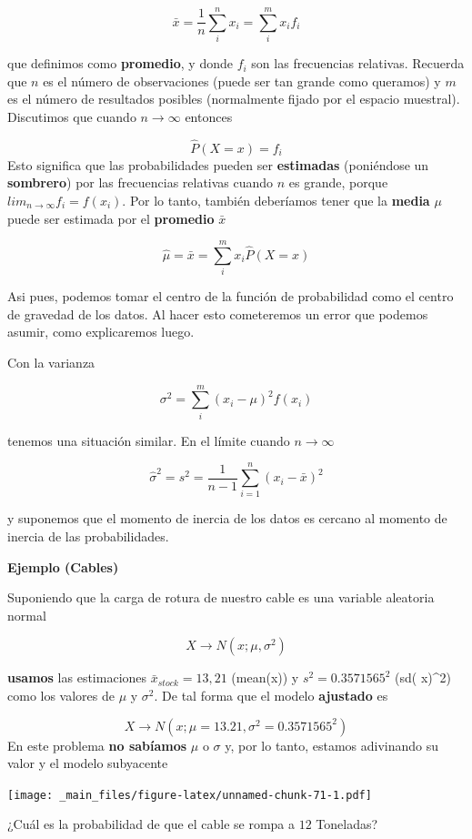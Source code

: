 \documentclass[
]{book}
\begin{document}
\[\bar{x}= \frac{1}{n} \sum_{i}^n x_i = \sum_{i}^m x_if_i\]

que definimos como \textbf{promedio}, y donde \(f_i\) son las frecuencias relativas. Recuerda que \(n\) es el número de observaciones (puede ser tan grande como queramos) y \(m\) es el número de resultados posibles (normalmente fijado por el espacio muestral). Discutimos que cuando \(n \rightarrow \infty\) entonces

\[\hat{P}(X=x)=f_i\]
Esto significa que las probabilidades pueden ser \textbf{estimadas} (poniéndose un \textbf{sombrero}) por las frecuencias relativas cuando \(n\) es grande, porque \(lim_{n\rightarrow \infty}f_i=f(x_i)\). Por lo tanto, también deberíamos tener que la \textbf{media} \(\mu\) puede ser estimada por el \textbf{promedio} \(\bar{x}\)

\[\hat{\mu}=\bar{x}= \sum_{i}^m x_i\hat{P}(X=x)\]

Asi pues, podemos tomar el centro de la función de probabilidad como el centro de gravedad de los datos. Al hacer esto cometeremos un error que podemos asumir, como explicaremos luego.

Con la varianza

\[\sigma^2=\sum_{i}^m (x_i-\mu)^2f(x_i)\]

tenemos una situación similar. En el límite cuando \(n \rightarrow \infty\)

\[\hat{\sigma}^2=s^2=\frac{1}{n-1}\sum_{i=1}^n (x_i-\bar{x})^2\]

y suponemos que el momento de inercia de los datos es cercano al momento de inercia de las probabilidades.

\textbf{Ejemplo (Cables)}

Suponiendo que la carga de rotura de nuestro cable es una variable aleatoria normal

\[X \rightarrow N(x; \mu, \sigma^2)\]

\textbf{usamos} las estimaciones \(\bar{x}_{stock}=13,21\) (mean(x)) y \(s^2=0.3571565^2\) (sd( x)\^{}2) como los valores de \(\mu\) y \(\sigma^2\). De tal forma que el modelo \textbf{ajustado} es

\[X \rightarrow N(x; \mu=13.21, \sigma^2=0.3571565^2)\]
En este problema \textbf{no sabíamos} \(\mu\) o \(\sigma\) y, por lo tanto, estamos adivinando su valor y el modelo subyacente

\texttt{[image: \_main\_files/figure-latex/unnamed-chunk-71-1.pdf]}

¿Cuál es la probabilidad de que el cable se rompa a \(12\) Toneladas?
\end{document}
